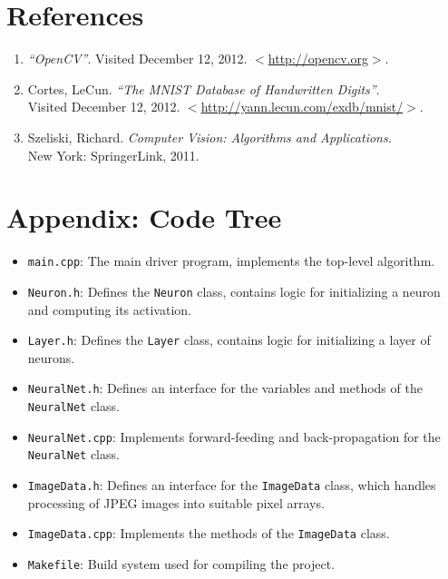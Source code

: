 \documentclass[11pt]{article}
\begin{document}
\section{References}

\begin{enumerate}
\item \emph{``OpenCV''}. Visited December 12, 2012. $<$\url{http://opencv.org}$>$.

\item Cortes, LeCun. \emph{``The MNIST Database of Handwritten Digits''}.\\
Visited December 12, 2012. $<$\url{http://yann.lecun.com/exdb/mnist/}$>$.

\item Szeliski, Richard. \emph{Computer Vision: Algorithms and Applications.}\\ New York: SpringerLink, 2011.

\end{enumerate}

\section{Appendix: Code Tree}

\begin{itemize}
\item \texttt{main.cpp}: The main driver program, implements the top-level algorithm.

\item \texttt{Neuron.h}: Defines the \texttt{Neuron} class, contains logic for initializing a neuron and computing its activation.

\item \texttt{Layer.h}: Defines the \texttt{Layer} class, contains logic for initializing a layer of neurons.

\item \texttt{NeuralNet.h}: Defines an interface for the variables and methods of the \texttt{NeuralNet} class.

\item \texttt{NeuralNet.cpp}: Implements forward-feeding and back-propagation for the \texttt{NeuralNet} class.

\item \texttt{ImageData.h}: Defines an interface for the \texttt{ImageData} class, which handles processing of JPEG images into suitable pixel arrays.

\item \texttt{ImageData.cpp}: Implements the methods of the \texttt{ImageData} class.

\item \texttt{Makefile}: Build system used for compiling the project.
\end{itemize}
\end{document}
